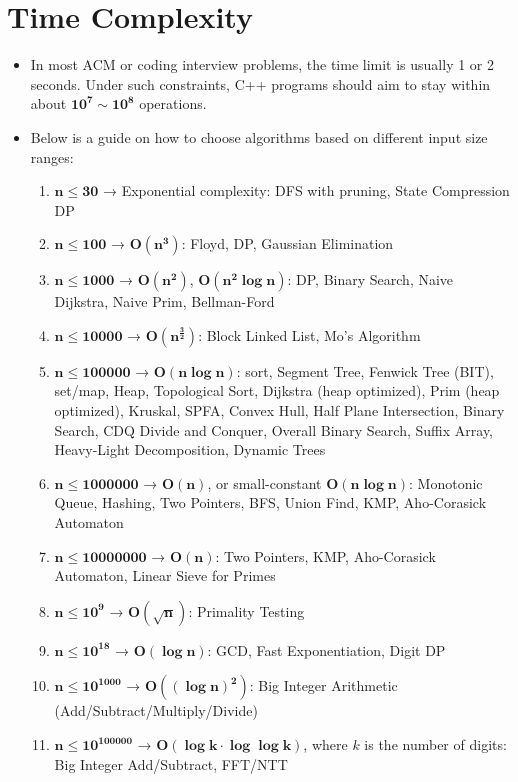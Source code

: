 \section{Time Complexity}
\begin{itemize}
  \item In most ACM or coding interview problems, the time limit is usually 1 or 2 seconds. Under such constraints, C++ programs should aim to stay within about $\mathbf{10^7 \sim 10^8}$ operations.
  
  \item Below is a guide on how to choose algorithms based on different input size ranges:

  \begin{enumerate}
    \item $\mathbf{n \leq 30}$ → Exponential complexity: DFS with pruning, State Compression DP
    \item $\mathbf{n \leq 100}$ → $\mathbf{O(n^3)}$: Floyd, DP, Gaussian Elimination
    \item $\mathbf{n \leq 1000}$ → $\mathbf{O(n^2)}$, $\mathbf{O(n^2 \log n)}$: DP, Binary Search, Naive Dijkstra, Naive Prim, Bellman-Ford
    \item $\mathbf{n \leq 10000}$ → $\mathbf{O(n^{\frac{3}{2}})}$: Block Linked List, Mo's Algorithm
    \item $\mathbf{n \leq 100000}$ → $\mathbf{O(n \log n)}$: sort, Segment Tree, Fenwick Tree (BIT), set/map, Heap, Topological Sort, Dijkstra (heap optimized), Prim (heap optimized), Kruskal, SPFA, Convex Hull, Half Plane Intersection, Binary Search, CDQ Divide and Conquer, Overall Binary Search, Suffix Array, Heavy-Light Decomposition, Dynamic Trees
    \item $\mathbf{n \leq 1000000}$ → $\mathbf{O(n)}$, or small-constant $\mathbf{O(n \log n)}$: Monotonic Queue, Hashing, Two Pointers, BFS, Union Find, KMP, Aho-Corasick Automaton
    \item $\mathbf{n \leq 10000000}$ → $\mathbf{O(n)}$: Two Pointers, KMP, Aho-Corasick Automaton, Linear Sieve for Primes
    \item $\mathbf{n \leq 10^9}$ → $\mathbf{O(\sqrt{n})}$: Primality Testing
    \item $\mathbf{n \leq 10^{18}}$ → $\mathbf{O(\log n)}$: GCD, Fast Exponentiation, Digit DP
    \item $\mathbf{n \leq 10^{1000}}$ → $\mathbf{O((\log n)^2)}$: Big Integer Arithmetic (Add/Subtract/Multiply/Divide)
    \item $\mathbf{n \leq 10^{100000}}$ → $\mathbf{O(\log k \cdot \log \log k)}$, where $k$ is the number of digits: Big Integer Add/Subtract, FFT/NTT
  \end{enumerate}
\end{itemize}
\newpage
